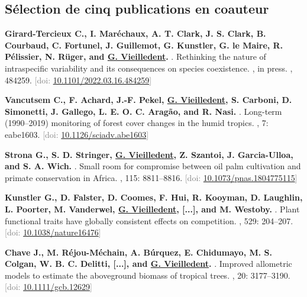 \documentclass[10pt,a4paper,sans]{moderncv}
\newcounter{enumiv_gv}
\newcommand\doi[1]{[doi: \href{https://doi.org/#1}{#1}]}
\begin{document}
\vspace{0.3cm}
\subsection{Sélection de cinq publications en coauteur}

\begin{thebibliography}{5}

\setcounter{enumiv}{4}
\textbf{Girard-Tercieux C., I. Maréchaux, A. T. Clark, J. S. Clark, B. Courbaud, C. Fortunel, J. Guillemot, G. Kunstler, G. le Maire, R. Pélissier, N. Rüger, and \underline{G. Vieilledent}.}
.
\newblock Rethinking the nature of intraspecific variability and its consequences on species coexistence.
, in press.
, 484259.
\newblock \textcolor{gray}{\doi{10.1101/2022.03.16.484259}}
  
\setcounter{enumiv}{3}
\textbf{Vancutsem C., F. Achard, J.-F. Pekel, \underline{G. Vieilledent}, S. Carboni, D. Simonetti, J. Gallego, L. E. O. C. Aragão, and R. Nasi.}
.
\newblock Long-term (1990--2019) monitoring of forest cover changes in the humid tropics.
, 7: eabe1603.
\newblock \textcolor{gray}{\doi{10.1126/sciadv.abe1603}}

\setcounter{enumiv}{2}
\textbf{Strona G., S. D. Stringer, \underline{G. Vieilledent}, Z. Szantoi, J. Garcia-Ulloa, and S. A. Wich.}
.
\newblock Small room for compromise between oil palm cultivation and primate conservation in Africa.
, 115: 8811--8816.
\newblock \textcolor{gray}{\doi{10.1073/pnas.1804775115}}

\setcounter{enumiv}{1}
\textbf{Kunstler G., D. Falster, D. Coomes, F. Hui, R. Kooyman, D. Laughlin, L. Poorter, M. Vanderwel, \underline{G. Vieilledent}, [...], and M. Westoby.} 
.
\newblock Plant functional traits have globally consistent effects on competition.
, 529: 204--207.
\newblock \textcolor{gray}{\doi{10.1038/nature16476}}

\setcounter{enumiv}{0}
\textbf{Chave J., M. Réjou-Méchain, A. Búrquez, E. Chidumayo, M. S. Colgan, W. B. C. Delitti, [...], and \underline{G. Vieilledent}.} 
.
\newblock Improved allometric models to estimate the aboveground biomass of tropical trees. 
, 20: 3177--3190.
\newblock \textcolor{gray}{\doi{10.1111/gcb.12629}}

\end{thebibliography}
\end{document}
